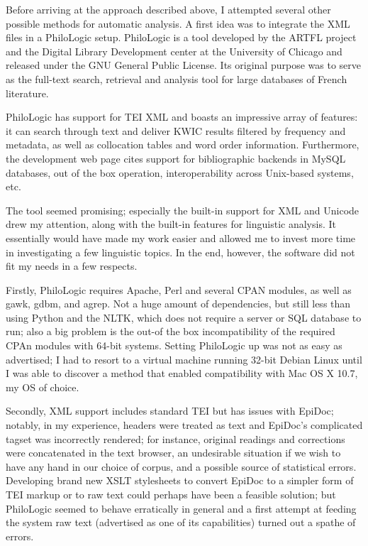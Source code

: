 Before arriving at the approach described above, I attempted several other
possible methods for automatic analysis. A first idea was to integrate the XML
files in a PhiloLogic setup.  PhiloLogic is a tool developed by the ARTFL
project and the Digital Library Development center at the University of Chicago
and released under the GNU General Public License. Its original purpose was to
serve as the full-text search, retrieval and analysis tool for large databases
of French literature.

PhiloLogic has support for TEI XML and boasts an impressive
array of features: it can search through text and deliver KWIC results
filtered by frequency and metadata, as well as collocation tables and word
order information.  Furthermore, the development web page cites support for
bibliographic backends in MySQL databases, out of the box operation,
interoperability across Unix-based systems, etc.

The tool seemed promising; especially the built-in support for XML and
Unicode drew my attention, along with the built-in features for linguistic
analysis. It essentially would have made my work easier and allowed me to
invest more time in investigating a few linguistic topics. In the end, however,
the software did not fit my needs in a few respects.

Firstly, PhiloLogic requires Apache, Perl and several CPAN modules, as well as
gawk, gdbm, and agrep.  Not a huge amount of dependencies, but still less than
using Python and the NLTK, which does not require a server or SQL database to
run; also a big problem is the out-of the box incompatibility of the required
CPAn  modules with 64-bit systems. Setting PhiloLogic up was not as
easy as advertised; I had to resort to a virtual machine running 32-bit Debian
Linux until I was able to discover a method that enabled compatibility with
Mac OS X 10.7, my OS of choice.

Secondly, XML support includes standard TEI  but has issues with EpiDoc; notably,
in my experience, headers were treated as text and EpiDoc's complicated tagset
was incorrectly rendered; for instance, original readings and corrections were
concatenated in the text browser, an undesirable situation if we wish to have
any hand in our choice of corpus, and a possible source of statistical errors.
Developing brand new XSLT stylesheets to convert EpiDoc to a simpler form of
TEI markup or to raw text could perhaps have been a feasible solution; but
PhiloLogic seemed to behave erratically in general and a first attempt at
feeding the system raw text (advertised as one of its capabilities) turned out
a spathe of errors.

